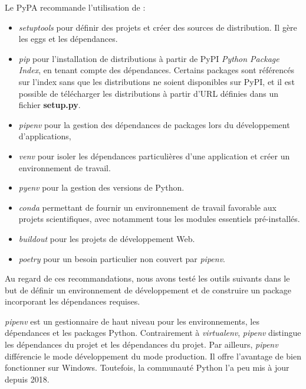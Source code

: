 \documentclass[twoside,a4paper,11pt,frenchb,openany]{report}
\begin{document}
	Le PyPA recommande l'utilisation de :
\begin{itemize}
\item \textit{setuptools} pour définir des projets et créer des sources de distribution. Il gère les eggs et les dépendances.
\item \textit{pip} pour l'installation de distributions à partir de PyPI \textit{Python Package Index}, en tenant compte des dépendances. Certains packages sont référencés sur l'index sans que les distributions ne soient disponibles sur PyPI, et il est possible de télécharger les distributions à partir d'URL définies dans un fichier \textbf{setup.py}.
\item \textit{pipenv} pour la gestion des dépendances de packages lors du développement d'applications,
\item \textit{venv} pour isoler les dépendances particulières d'une application et créer un environnement de travail.
\item \textit{pyenv} pour la gestion des versions de Python.
\item \textit{conda} permettant de fournir un environnement de travail favorable aux projets scientifiques, avec notamment tous les modules essentiels pré-installés.
\item \textit{buildout} pour les projets de développement Web.
\item \textit{poetry} pour un besoin particulier non couvert par \textit{pipenv}.
\end{itemize}

Au regard de ces recommandations, nous avons testé les outils suivants dans le but de définir un environnement de développement et de construire un package incorporant les dépendances requises.

\textit{pipenv} est un gestionnaire de haut niveau pour les environnements, les dépendances et les packages Python. Contrairement à \textit{virtualenv}, \textit{pipenv} distingue les dépendances du projet et les dépendances du projet. Par ailleurs, \textit{pipenv} différencie le mode développement du mode production. Il offre l'avantage de bien fonctionner sur Windows. Toutefois, la communauté Python l'a peu mis à jour depuis 2018.
\end{document}
